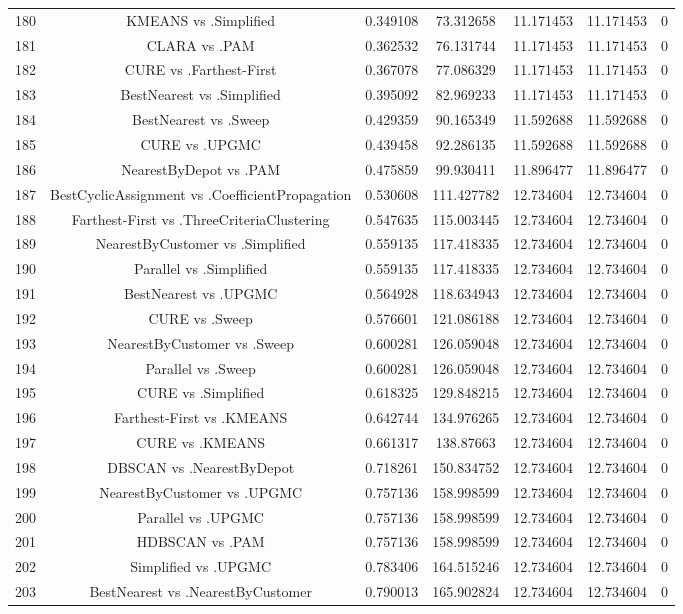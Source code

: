 \documentclass[a4paper,10pt]{article}
\begin{document}
\begin{landscape}
\begin{table}[!htp]
\begin{tabular}{ccccccc}
180&KMEANS vs .Simplified&0.349108&73.312658&11.171453&11.171453&0\\
181&CLARA vs .PAM&0.362532&76.131744&11.171453&11.171453&0\\
182&CURE vs .Farthest-First&0.367078&77.086329&11.171453&11.171453&0\\
183&BestNearest vs .Simplified&0.395092&82.969233&11.171453&11.171453&0\\
184&BestNearest vs .Sweep&0.429359&90.165349&11.592688&11.592688&0\\
185&CURE vs .UPGMC&0.439458&92.286135&11.592688&11.592688&0\\
186&NearestByDepot vs .PAM&0.475859&99.930411&11.896477&11.896477&0\\
187&BestCyclicAssignment vs .CoefficientPropagation&0.530608&111.427782&12.734604&12.734604&0\\
188&Farthest-First vs .ThreeCriteriaClustering&0.547635&115.003445&12.734604&12.734604&0\\
189&NearestByCustomer vs .Simplified&0.559135&117.418335&12.734604&12.734604&0\\
190&Parallel vs .Simplified&0.559135&117.418335&12.734604&12.734604&0\\
191&BestNearest vs .UPGMC&0.564928&118.634943&12.734604&12.734604&0\\
192&CURE vs .Sweep&0.576601&121.086188&12.734604&12.734604&0\\
193&NearestByCustomer vs .Sweep&0.600281&126.059048&12.734604&12.734604&0\\
194&Parallel vs .Sweep&0.600281&126.059048&12.734604&12.734604&0\\
195&CURE vs .Simplified&0.618325&129.848215&12.734604&12.734604&0\\
196&Farthest-First vs .KMEANS&0.642744&134.976265&12.734604&12.734604&0\\
197&CURE vs .KMEANS&0.661317&138.87663&12.734604&12.734604&0\\
198&DBSCAN vs .NearestByDepot&0.718261&150.834752&12.734604&12.734604&0\\
199&NearestByCustomer vs .UPGMC&0.757136&158.998599&12.734604&12.734604&0\\
200&Parallel vs .UPGMC&0.757136&158.998599&12.734604&12.734604&0\\
201&HDBSCAN vs .PAM&0.757136&158.998599&12.734604&12.734604&0\\
202&Simplified vs .UPGMC&0.783406&164.515246&12.734604&12.734604&0\\
203&BestNearest vs .NearestByCustomer&0.790013&165.902824&12.734604&12.734604&0\\

\end{tabular}
\end{table}
\end{landscape}
\end{document}
